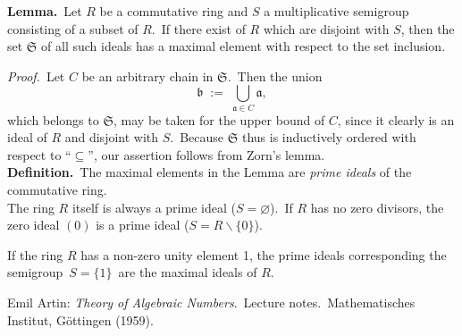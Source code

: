 \documentclass[12pt]{article}
\theoremstyle{definition}
\begin{document}
 

\textbf{Lemma.}\, Let $R$ be a commutative ring and $S$ a multiplicative semigroup consisting of a subset of $R$.\, If there exist  of $R$ which are disjoint with $S$, then the set $\mathfrak{S}$ of all such ideals has a maximal element with respect to the set inclusion.

{\em Proof.}\, Let $C$ be an arbitrary chain in $\mathfrak{S}$.\, Then the union
$$\mathfrak{b} \;:=\; \bigcup_{\mathfrak{a} \in C}\mathfrak{a},$$
which belongs to $\mathfrak{S}$, may be taken for the upper bound of $C$, since it clearly is an ideal of $R$ and disjoint with $S$.\, Because $\mathfrak{S}$ thus is inductively ordered with respect to ``$\subseteq$'', our assertion follows from Zorn's lemma.\\

\textbf{Definition.}\, The maximal elements in the Lemma are {\em prime ideals} of the commutative ring.\\

The ring $R$ itself is always a prime ideal ($S = \varnothing$).\, If $R$ has no zero divisors, the zero ideal $(0)$ is a prime ideal ($S = R\!\smallsetminus\!\{0\}$).

If the ring $R$ has a non-zero unity element 1, the prime ideals corresponding the semigroup \,$S = \{1\}$\, are the maximal ideals of $R$.


\begin{thebibliography}{9}
 {\sc Emil Artin}: {\em Theory of Algebraic Numbers}.\, Lecture notes.\, Mathematisches Institut, G\"ottingen (1959).
\end{thebibliography}

\end{document}
